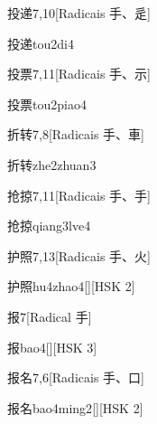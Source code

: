 \begin{entry}{投递}{7,10}[Radicais ⼿、⾡]
  \begin{phonetics}{投递}{tou2di4}
  \end{phonetics}
\end{entry}

\begin{entry}{投票}{7,11}[Radicais ⼿、⽰]
  \begin{phonetics}{投票}{tou2piao4}
  \end{phonetics}
\end{entry}

\begin{entry}{折转}{7,8}[Radicais ⼿、⾞]
  \begin{phonetics}{折转}{zhe2zhuan3}
  \end{phonetics}
\end{entry}

\begin{entry}{抢掠}{7,11}[Radicais ⼿、⼿]
  \begin{phonetics}{抢掠}{qiang3lve4}
  \end{phonetics}
\end{entry}

\begin{entry}{护照}{7,13}[Radicais ⼿、⽕]
  \begin{phonetics}{护照}{hu4zhao4}[][HSK 2]
  \end{phonetics}
\end{entry}

\begin{entry}{报}{7}[Radical ⼿]
  \begin{phonetics}{报}{bao4}[][HSK 3]
  \end{phonetics}
\end{entry}

\begin{entry}{报名}{7,6}[Radicais ⼿、⼝]
  \begin{phonetics}{报名}{bao4ming2}[][HSK 2]
  \end{phonetics}
\end{entry}

